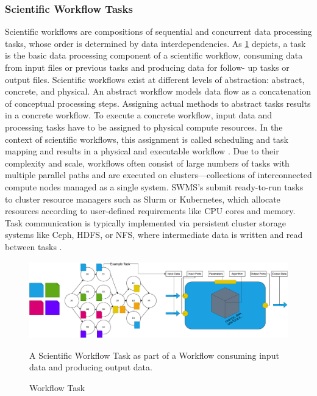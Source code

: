 \subsubsection{Scientific Workflow Tasks}
\label{sec:background_workflows_examples}
Scientific workflows are compositions of sequential and concurrent data processing tasks, whose order is determined by data interdependencies. As \ref{fig:02-workflow-task} depicts, a task is the basic data processing component of a scientific workflow, consuming data from input files or previous tasks and producing data for follow- up tasks or output files. Scientific workflows exist at different levels of abstraction: abstract, concrete, and physical. An abstract workflow models data flow as a concatenation of conceptual processing steps. Assigning actual methods to abstract tasks results in a concrete workflow. To execute a concrete workflow, input data and processing tasks have to be assigned to physical compute resources. In the context of scientific workflows, this assignment is called scheduling and task mapping and results in a physical and executable workflow \cite{Bux2013}.
Due to their complexity and scale, workflows often consist of large numbers of tasks with multiple parallel paths and are executed on clusters—collections of interconnected compute nodes managed as a single system. SWMS's submit ready-to-run tasks to cluster resource managers such as Slurm or Kubernetes, which allocate resources according to user-defined requirements like CPU cores and memory. Task communication is typically implemented via persistent cluster storage systems like Ceph, HDFS, or NFS, where intermediate data is written and read between tasks \cite{thamsen2025energyawareworkflowexecutionoverview}.

\begin{figure}[H]
    \centering
    \includegraphics[scale=0.4]{fig/02/02-workflow-task.pdf}
    \caption{Workflow Task}
    \label{fig:02-workflow-task}
    \tiny
    A Scientific Workflow Task as part of a Workflow consuming input data and producing output data.
\end{figure}

